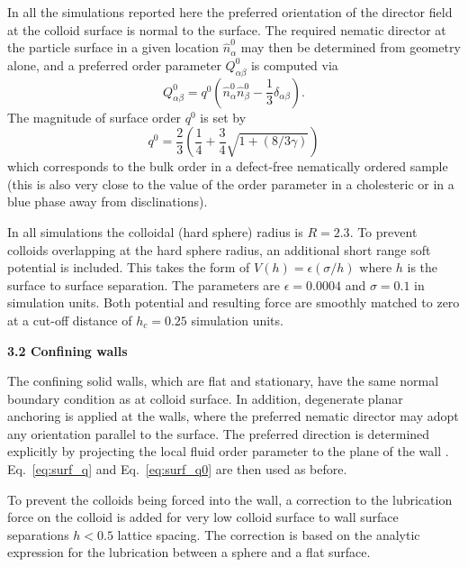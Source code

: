 \documentclass[12pt,twoside]{article}
\begin{document}
In all the simulations reported here the preferred orientation of the
director field at the colloid surface is normal to the surface. The
required nematic director at the particle surface in a given location
$\hat{n}^0_\alpha$ may then be determined from geometry alone,
and a preferred order parameter $Q_{\alpha\beta}^0$ is computed via
\begin{equation}
Q^0_{\alpha\beta} = q^0(\hat{n}_\alpha^0 \hat{n}_\beta^0 
- {\textstyle \frac{1}{3}} \delta_{\alpha\beta}).
\label{eq:surf_q}
\end{equation}
The magnitude of surface order $q^0$ is set by
\begin{equation}
q^0 = {\textstyle \frac{2}{3}} \left( {\textstyle \frac{1}{4}} 
+ {\textstyle \frac{3}{4}} \sqrt{1 + (8/3\gamma)} \right)
\label{eq:surf_q0}
\end{equation}
which corresponds to the bulk order in a defect-free nematically ordered 
sample~\cite{denniston} (this is also very close to the value of the order 
parameter in a cholesteric or in a blue phase away from disclinations).

In all simulations the colloidal (hard sphere) radius is $R = 2.3$. To
prevent colloids overlapping at the hard sphere radius, an additional
short range soft potential is included. This takes the form of
$V(h) = \epsilon (\sigma/h)$ where $h$ is the surface to surface separation.
The parameters are $\epsilon = 0.0004$ and $\sigma = 0.1$ in simulation
units. Both potential and resulting force are smoothly matched to zero at
a cut-off distance of $h_c = 0.25$ simulation units.

{\bf 3.2 Confining walls}

The confining solid walls, which are flat and stationary, have the
same normal boundary condition as at colloid surface. In addition,
degenerate planar anchoring is applied at the walls, where the
preferred nematic director may adopt any orientation parallel
to the surface. The preferred direction is determined explicitly
by projecting the local fluid order parameter to the plane of the
wall \cite{fournier2005}. Eq.~\ref{eq:surf_q} and Eq.~\ref{eq:surf_q0}
are then used as before.

To prevent the colloids being forced into the wall, a correction
to the lubrication force on the colloid is added for very low colloid
surface to wall surface separations $h < 0.5$ lattice spacing. The
correction is based on the analytic expression for the lubrication
between a sphere and a flat surface.
\end{document}
